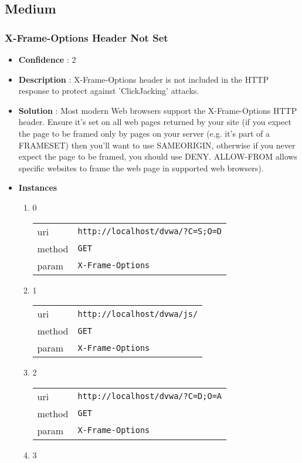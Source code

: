 \documentclass[10pt]{article}
\begin{document}
\subsection{Medium}
\subsubsection{X-Frame-Options Header Not Set}
\begin{itemize}
\item[] \textbf{Confidence} : 2
\item[] \textbf{Description} : X-Frame-Options header is not included in the HTTP response to protect against 'ClickJacking' attacks.
\item[] \textbf{Solution} :  Most modern Web browsers support the X-Frame-Options HTTP header. Ensure it's set on all web pages returned by your site (if you expect the page to be framed only by pages on your server (e.g. it's part of a FRAMESET) then you'll want to use SAMEORIGIN, otherwise if you never expect the page to be framed, you should use DENY. ALLOW-FROM allows specific websites to frame the web page in supported web browsers).
\item[] \textbf{Instances}
\begin{enumerate}
\item[] 0
\begin{tabular}{| l | p{12cm}}
uri & \texttt{http://localhost/dvwa/?C=S;O=D} \\
method & \texttt{GET} \\
param & \texttt{X-Frame-Options} \\
\end{tabular}
\item[] 1
\begin{tabular}{| l | p{12cm}}
uri & \texttt{http://localhost/dvwa/js/} \\
method & \texttt{GET} \\
param & \texttt{X-Frame-Options} \\
\end{tabular}
\item[] 2
\begin{tabular}{| l | p{12cm}}
uri & \texttt{http://localhost/dvwa/?C=D;O=A} \\
method & \texttt{GET} \\
param & \texttt{X-Frame-Options} \\
\end{tabular}
\item[] 3
\begin{tabular}{| l | p{12cm}}

\end{tabular}
\end{enumerate}
\end{itemize}
\end{document}
